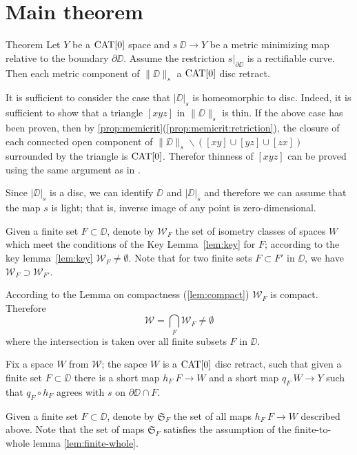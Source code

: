 \documentclass{article}
\begin{document}
\section{Main theorem}\label{Main theorem}

\begin{thm}{Theorem}\label{thm:main}
Let $Y$ be a $\mathop{\rm CAT}\nolimits[0]$ space 
and $s\:\DD\to Y$ be a metric minimizing map relative to the boundary $\partial\DD$.
Assume the restriction $s|_{\partial\DD}$ is a rectifiable curve.
Then each metric component of $\|\DD\|_s$ a $\mathop{\rm CAT}\nolimits[0]$ disc retract. 
\end{thm}

It is sufficient to consider
the case that $|\DD|_s$ is  homeomorphic to disc.
Indeed, it is sufficient to show that a triangle $[xyz]$ in $\|\DD\|_s$ is thin. 
If the above case has been proven, then by \ref{prop:memicrit}(\ref{prop:memicrit:retriction}),
the closure of each connected open component of $\|\DD\|_s\backslash ([xy]\cup[yz]\cup[zx])$
surrounded by the triangle is $\mathop{\rm CAT}\nolimits[0]$.
Therefor thinness of $[xyz]$ can be proved using the same argument as in \cite{bishop}.

Since $|\DD|_s$ is a disc, we can identify $\DD$ and $|\DD|_s$
and therefore we can assume that the map $s$ is light;
that is, inverse image of any point is zero-dimensional.

Given a finite set $F\subset \DD$,
denote by $\mathcal{W}_F$
the set of isometry classes of spaces $W$ which meet the conditions of the Key Lemma~\ref{lem:key}
for $F$;
according to the key lemma~\ref{lem:key} $\mathcal{W}_F\ne\emptyset$.
Note that for two finite sets $F\subset F'$ in $\DD$,
we have $\mathcal{W}_F\supset \mathcal{W}_{F'}$.

According to the Lemma on compactness (\ref{lem:compact}) $\mathcal{W}_F$ is compact.
Therefore 
\[\mathcal{W}
=
\bigcap_{F}\mathcal{W}_F\ne \emptyset\]
where the intersection is taken over all finite subsets $F$ in $\DD$. 


Fix a space $W$ from $\mathcal{W}$;
the sapce $W$ is a $\mathop{\rm CAT}\nolimits[0]$ disc retract,
such that given a finite set $F\subset \DD$ there is a short map $h_F\:F\to W$ 
and a short map $q_F\:W\to Y$ such that $q_F\circ h_F$ agrees with $s$ on $\partial\DD\cap F$.

Given a finite set $F\subset \DD$,
denote by $\mathfrak{S}_F$ the set of all maps $h_F\:F\to W$ described above.
Note that the set of maps $\mathfrak{S}_F$ satisfies the assumption of the finite-to-whole lemma \ref{lem:finite-whole}.
\end{document}
